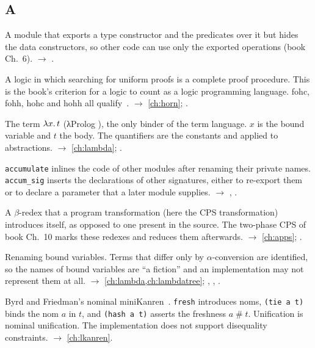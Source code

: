 \subsection*{A}
\begin{glossarylist}
\item[Abstract datatype] A module that exports a type constructor and the predicates over it but hides the data
  constructors, so other code can use only the exported operations (book Ch.~6). $\rightarrow$ .
\item[Abstract logic programming language] A logic in which searching for uniform proofs is a complete proof
  procedure. This is the book's criterion for a logic to count as a logic programming language. fohc, fohh, hohc
  and hohh all qualify~\cite{MillerNadathurPfenningScedrov1991}. $\rightarrow$ \cref{ch:horn}; .
\item[Abstraction] The term $\lambda x.\,t$ (λProlog ), the only binder of the term language. $x$ is the
  bound variable and $t$ the body. The quantifiers are the constants  and  applied to
  abstractions. $\rightarrow$ \cref{ch:lambda}; .
\item[Accumulation (module, signature)] \texttt{accumulate} inlines the code of other modules after renaming
  their private names. \texttt{accum\_sig} inserts the declarations of other signatures, either to re-export them
  or to declare a parameter that a later module supplies. $\rightarrow$ , .
\item[Administrative redex] A $\beta$-redex that a program transformation (here the CPS transformation) introduces
  itself, as opposed to one present in the source. The two-phase CPS of book Ch.~10 marks these redexes and
  reduces them afterwards. $\rightarrow$ \cref{ch:apps}; .
\item[$\alpha$-conversion] Renaming bound variables. Terms that differ only by $\alpha$-conversion are identified,
  so the names of bound variables are \enquote{a fiction} and an implementation may not represent them at all.
  $\rightarrow$ \cref{ch:lambda,ch:lambdatree}; , , .
\item[αKanren] Byrd and Friedman's nominal miniKanren~\cite{ByrdFriedman2007,Byrd2009}. \texttt{fresh}
  introduces noms, \texttt{(tie a t)} binds the nom $a$ in $t$, and \texttt{(hash a t)} asserts the freshness
  $a\mathbin{\#}t$. Unification is nominal unification. The implementation does not support disequality
  constraints. $\rightarrow$ \cref{ch:lkanren}.

\end{glossarylist}
